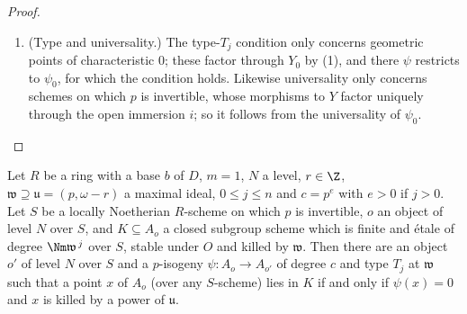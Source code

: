 \begin{proof}
\begin{enumerate}
  locally Noetherian scheme whose local rings are integrally closed domains, a $p$-isogeny between
  the restrictions of two objects to a dense open subscheme extends to a $p$-isogeny of the same
  degree) there is a $p$-isogeny $\psi\colon A_o\to A_{o'}$ of degree $c$ restricting to $\psi_0$.
\item (Type and universality.) The type-$T_j$ condition only concerns geometric points of
  characteristic $0$; these factor through $Y_0$ by (1), and there $\psi$ restricts to $\psi_0$, for
  which the condition holds. Likewise universality only concerns schemes on which $p$ is invertible,
  whose morphisms to $Y$ factor uniquely through the open immersion $i$; so it follows from the
  universality of $\psi_0$.
\end{enumerate}
\end{proof}

\begin{proposition}\label{pf:ks2:quotobj}
Let $R$ be a ring with a base $b$ of $D$, $m=1$, $N$ a level, $r\in\Z$, $\mathfrak w\supseteq
\mathfrak u=(p,\omega-r)$ a maximal ideal, $0\le j\le n$ and $c=p^e$ with $e>0$ if $j>0$. Let $S$ be
a locally Noetherian $R$-scheme on which $p$ is invertible, $o$ an object of level $N$ over $S$, and
$K\subseteq A_o$ a closed subgroup scheme which is finite and \'etale of degree $\Nm\mathfrak w^{\,j}$
over $S$, stable under $O$ and killed by $\mathfrak w$. Then there are an object $o'$ of level $N$
over $S$ and a $p$-isogeny $\psi\colon A_o\to A_{o'}$ of degree $c$ and type $T_j$ at $\mathfrak w$
such that a point $x$ of $A_o$ (over any $S$-scheme) lies in $K$ if and only if $\psi(x)=0$ and $x$
is killed by a power of $\mathfrak u$.
\end{proposition}

